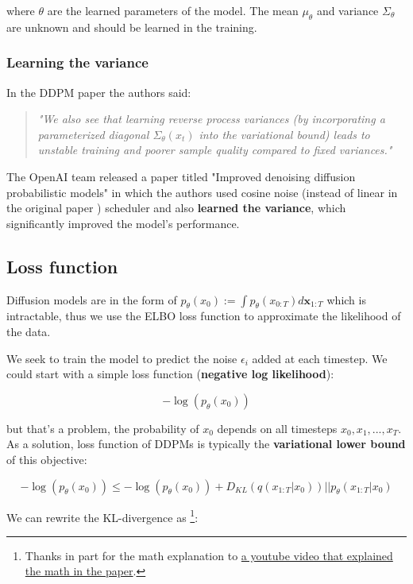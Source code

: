 where $\theta$ are the learned parameters of the model. The mean $\mu_\theta$ and variance $\Sigma_\theta$ are unknown and should be learned in the training. 


\subsubsection*{Learning the variance}

In the DDPM paper \cite{ddpm} the authors said:

\begin{quote}
    \textit{"We also see that learning reverse process variances (by incorporating a parameterized diagonal $\Sigma_\theta(x_t)$ into the variational bound) leads to unstable training and poorer sample quality compared to fixed variances."} \cite{ddpm}
\end{quote}

The OpenAI team released a paper titled "Improved denoising diffusion probabilistic models" \cite{openai_improved_ddpm} in which the authors used cosine noise (instead of linear in the original paper \cite{ddpm}) scheduler and also \textbf{learned the variance}, which significantly improved the model's performance.








\subsection{Loss function}

Diffusion models are in the form of $p_\theta (x_0) := \int p_\theta(x_{0:T}) d\mathbf{x}_{1:T}$ which is intractable, thus we use the ELBO loss function to approximate the likelihood of the data.

We seek to train the model to predict the noise $\epsilon_i$ added at each timestep. We could start with a simple loss function (\textbf{negative log likelihood}):

\[ -\log (p_\theta (x_0)) \]

but that's a problem, the probability of $x_0$ depends on all timesteps $x_0, x_1, ..., x_T$. As a solution, loss function of DDPMs is typically the \textbf{variational lower bound} of this objective:

\[
    -\log (p_\theta(x_0)) \leq -\log (p_\theta(x_0)) + D_{KL} (q(x_{1:T} | x_0)) \vert \vert p_\theta(x_{1:T} | x_0)
\]

We can rewrite the KL-divergence as \footnote{Thanks in part for the math explanation to \href{https://www.youtube.com/watch?v=HoKDTa5jHvg}{a youtube video that explained the math in the paper}.}:

